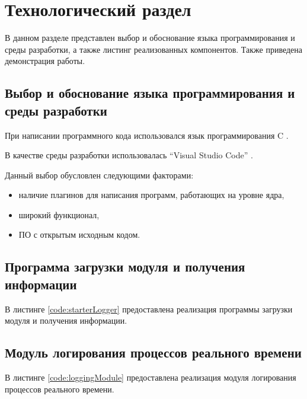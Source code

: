 \section{Технологический раздел}
В данном разделе представлен выбор и обоснование языка программирования и среды разработки, а также листинг реализованных компонентов. Также приведена демонстрация работы.

\subsection{Выбор и обоснование языка программирования и среды разработки}
При написании программного кода использовался язык программирования C \cite{cLanguage}.

В качестве среды разработки использовалась ``Visual Studio Code'' \cite{VSCode}.

Данный выбор обусловлен следующими факторами:
\begin{itemize}
\item наличие плагинов для написания программ, работающих на уровне ядра,
\item широкий функционал,
\item ПО с открытым исходным кодом.
\end{itemize}

\subsection{Программа загрузки модуля и получения информации}
В листинге \ref{code:starterLogger} предоставлена реализация программы загрузки модуля и получения информации.


\subsection{Модуль логирования процессов реального времени}
В листинге \ref{code:loggingModule} предоставлена реализация модуля логирования процессов реального времени.
\newpage
{}

